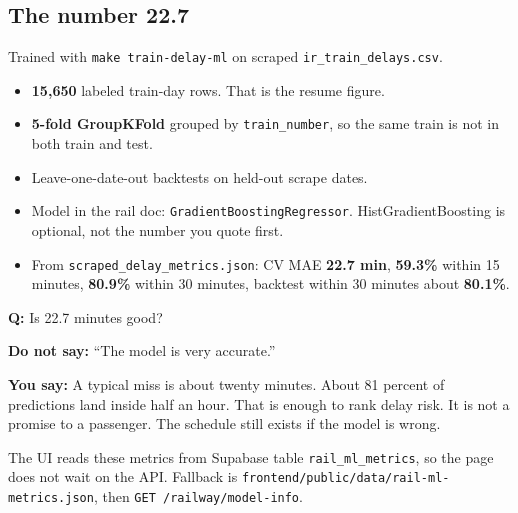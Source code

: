 \documentclass[a4paper,9.5pt]{extarticle}
\newcommand{\Q}[1]{\par\vspace{1.2pt}\noindent\textcolor{hot}{\textbf{Q:} #1}\par}
\newcommand{\Say}[1]{\noindent\textcolor{ok}{\textbf{You say:} #1}\par}
\newcommand{\No}[1]{\noindent\textcolor{muted}{\textbf{Do not say:} #1}\par}
\begin{document}
\subsection{The number 22.7}
Trained with \texttt{make train-delay-ml} on scraped \texttt{ir\_train\_delays.csv}.
\begin{itemize}
  \item \textbf{15{,}650} labeled train-day rows. That is the resume figure.
  \item \textbf{5-fold GroupKFold} grouped by \texttt{train\_number}, so the same train is not in both train and test.
  \item Leave-one-date-out backtests on held-out scrape dates.
  \item Model in the rail doc: \texttt{GradientBoostingRegressor}. HistGradientBoosting is optional, not the number you quote first.
  \item From \texttt{scraped\_delay\_metrics.json}: CV MAE \textbf{22.7 min}, \textbf{59.3\%} within 15 minutes, \textbf{80.9\%} within 30 minutes, backtest within 30 minutes about \textbf{80.1\%}.
\end{itemize}
\Q{Is 22.7 minutes good?}
\No{``The model is very accurate.''}
\Say{A typical miss is about twenty minutes. About 81 percent of predictions land inside half an hour. That is enough to rank delay risk. It is not a promise to a passenger. The schedule still exists if the model is wrong.}

The UI reads these metrics from Supabase table \texttt{rail\_ml\_metrics}, so the page does not wait on the API. Fallback is \texttt{frontend/public/data/rail-ml-metrics.json}, then \texttt{GET /railway/model-info}.
\end{document}
